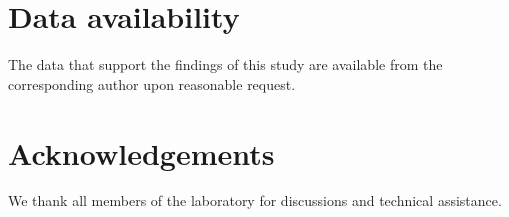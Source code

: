 \documentclass[11pt]{article}
\begin{document}
\section*{Data availability}
The data that support the findings of this study are available from the corresponding author upon reasonable request.

\section*{Acknowledgements}
We thank all members of the laboratory for discussions and technical assistance.



\end{document}
